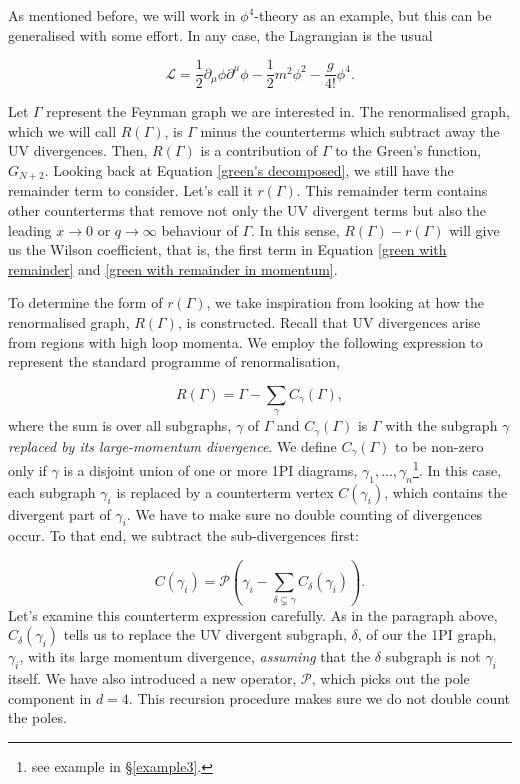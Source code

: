 \documentclass{article}
\begin{document}
As mentioned before, we will work in $\phi^4$-theory as an example, but this can be generalised with  some effort. In any case, the Lagrangian is the usual

\begin{equation}
    \mathcal{L}= \frac{1}{2}\partial_\mu\phi\partial^\mu\phi - \frac{1}{2}m^2\phi^2 - \frac{g}{4!}\phi^4.
\end{equation}

Let $\Gamma$ represent the Feynman graph we are interested in. The renormalised graph, which we will call $R(\Gamma)$, is $\Gamma$ minus the counterterms which subtract away the UV divergences. Then, $R(\Gamma)$ is a contribution of $\Gamma$ to the Green's function, $G_{N+2}$. Looking back at Equation \ref{green's decomposed}, we still have the remainder term to consider. Let's call it $r(\Gamma)$. This remainder term contains other counterterms that remove not only the UV divergent terms but also the leading $x\rightarrow 0$ or $q \rightarrow \infty$ behaviour of $\Gamma$. In this sense, $R(\Gamma) - r(\Gamma)$ will give us the Wilson coefficient, that is, the first term in Equation \ref{green with remainder} and \ref{green with remainder in momentum}.

To determine the form of $r(\Gamma)$, we take inspiration from looking at how the renormalised graph, $R(\Gamma)$, is constructed. Recall that UV divergences arise from regions with high loop momenta. We employ the following expression to represent the standard programme of renormalisation,

\begin{equation}
    R(\Gamma) = \Gamma - \sum_\gamma C_\gamma(\Gamma),
\end{equation}
where the sum is over all subgraphs, $\gamma$ of $\Gamma$ and $C_\gamma(\Gamma)$ is $\Gamma$ with the subgraph $\gamma$ \textit{replaced by its large-momentum divergence}. We define $C_\gamma(\Gamma)$ to be non-zero only if $\gamma$ is a disjoint union of one or more 1PI diagrams, $\gamma_1,\dots,\gamma_n$\footnote{see example in \S\ref{example3}.}. In this case, each subgraph $\gamma_i$ is replaced by a counterterm vertex $C(\gamma_i)$, which contains the divergent part of $\gamma_i$. We have to make sure no double counting of divergences occur. To that end, we subtract the sub-divergences first:

\begin{equation}
    C(\gamma_i) = \mathcal{P}\left(\gamma_i - \sum_{\delta \varsubsetneq \gamma}C_\delta(\gamma_i)\right).
    \label{counterterm gamma}
\end{equation}
Let's examine this counterterm expression carefully. As in the paragraph above, $C_\delta(\gamma_i)$ tells us to replace the UV divergent subgraph, $\delta$, of our the 1PI graph, $\gamma_i$, with its large momentum divergence, \textit{assuming} that the $\delta$ subgraph is not $\gamma_i$ itself. We have also introduced a new operator, $\mathcal{P}$, which picks out the pole component in $d=4$. This recursion procedure makes sure we do not double count the poles. 
\end{document}
